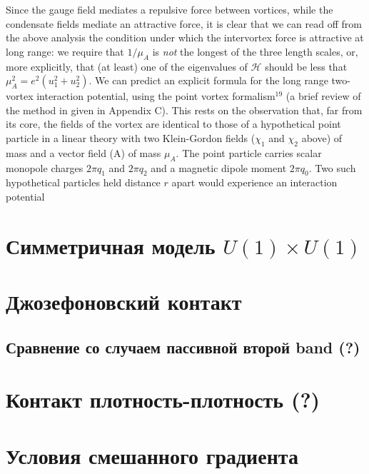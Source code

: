 Since the gauge field mediates a repulsive force between vortices, while the 
condensate fields mediate an attractive force, it is clear that we can read 
off from the above analysis the condition under which the intervortex force is 
attractive at long range: we require that \( 1/\mu_A \) is \emph{not} the 
longest of the three length scales, or, more explicitly, that (at least) one 
of the eigenvalues of \( \mathcal{H} \) should be less that 
\( \mu_A^2 = e^2(u_1^2 + u_2^2) \).  We can predict an explicit formula for 
the long range two-vortex interaction potential, using the point vortex 
formalism\( ^{19} \) (a brief review of the method in given in Appendix C). 
This rests on the observation that, far from its core, the fields of the 
vortex are identical to those of a hypothetical point particle in a linear 
theory with two Klein-Gordon fields (\( \chi_1 \) and \( \chi_2 \) above) of 
mass and a vector field (A) of mass \( \mu_A \). The point particle carries 
scalar monopole charges \( 2\pi q_1 \) and \( 2\pi q_2 \) and a magnetic 
dipole moment \( 2\pi q_0 \). Two such hypothetical particles held distance 
\( r \) apart would experience an interaction potential
\begin{equation}
    \label{eq:22}
\end{equation}

\section{Симметричная модель \texorpdfstring{$ U(1) \times U(1) $}
  {U(1) x U(1)}}
\label{sec:3-1}

\section{Джозефоновский контакт}
\label{sec:3-2}

\subsection{Сравнение со случаем пассивной второй band (?)}
\label{subsec:3-2-1}

\section{Контакт плотность-плотность (?)}
\label{sec:3-3}

\section{Условия смешанного градиента}
\label{sec:3-4}
